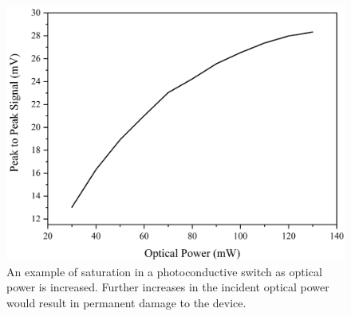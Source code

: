 \begin{figure}
    \centering
    \includegraphics[scale=0.4]{Figures/Misc/Theory/OptSweepGaAs102G.png}
    \captionsetup{font = footnotesize, justification = centering}
    \caption[An Example of Saturation in a Photoconductive Switch]{An example of saturation in a photoconductive switch as optical power is increased. Further increases in the incident optical power would result in permanent damage to the device.}
    \label{fig:saturation}
\end{figure}

